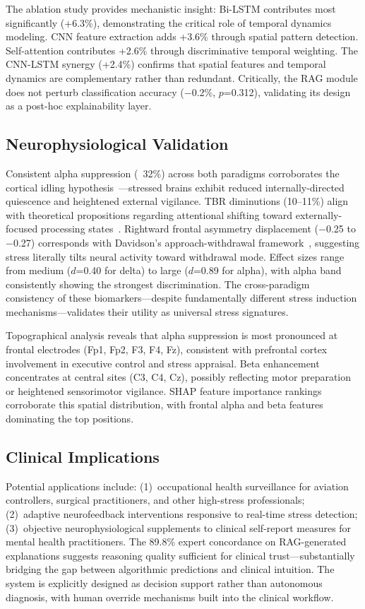 \documentclass[journal,twoside]{IEEEtran}
\begin{document}
The ablation study provides mechanistic insight: Bi-LSTM contributes most significantly (+6.3\%), demonstrating the critical role of temporal dynamics modeling. CNN feature extraction adds +3.6\% through spatial pattern detection. Self-attention contributes +2.6\% through discriminative temporal weighting. The CNN-LSTM synergy (+2.4\%) confirms that spatial features and temporal dynamics are complementary rather than redundant. Critically, the RAG module does not perturb classification accuracy ($-$0.2\%, $p$=0.312), validating its design as a post-hoc explainability layer.

\subsection{Neurophysiological Validation}

Consistent alpha suppression (~32\%) across both paradigms corroborates the cortical idling hypothesis~\cite{klimesch1999alpha}---stressed brains exhibit reduced internally-directed quiescence and heightened external vigilance. TBR diminutions (10--11\%) align with theoretical propositions regarding attentional shifting toward externally-focused processing states~\cite{putman2014eeg}. Rightward frontal asymmetry displacement ($-$0.25 to $-$0.27) corresponds with Davidson's approach-withdrawal framework~\cite{davidson2004well}, suggesting stress literally tilts neural activity toward withdrawal mode. Effect sizes range from medium ($d$=0.40 for delta) to large ($d$=0.89 for alpha), with alpha band consistently showing the strongest discrimination. The cross-paradigm consistency of these biomarkers---despite fundamentally different stress induction mechanisms---validates their utility as universal stress signatures.

Topographical analysis reveals that alpha suppression is most pronounced at frontal electrodes (Fp1, Fp2, F3, F4, Fz), consistent with prefrontal cortex involvement in executive control and stress appraisal. Beta enhancement concentrates at central sites (C3, C4, Cz), possibly reflecting motor preparation or heightened sensorimotor vigilance. SHAP feature importance rankings corroborate this spatial distribution, with frontal alpha and beta features dominating the top positions.

\subsection{Clinical Implications}

Potential applications include: (1)~occupational health surveillance for aviation controllers, surgical practitioners, and other high-stress professionals; (2)~adaptive neurofeedback interventions responsive to real-time stress detection; (3)~objective neurophysiological supplements to clinical self-report measures for mental health practitioners. The 89.8\% expert concordance on RAG-generated explanations suggests reasoning quality sufficient for clinical trust---substantially bridging the gap between algorithmic predictions and clinical intuition. The system is explicitly designed as decision support rather than autonomous diagnosis, with human override mechanisms built into the clinical workflow.
\end{document}
